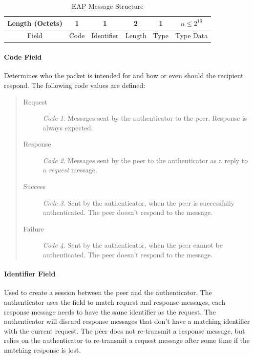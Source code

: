 \begin{table}
	\caption{EAP Message Structure}
	\vspace{0.1cm}
	\centering
	\begin{tabular}{|c|c|c|c|c|c|}
		\hline
		Length (Octets) & 1 & 1 & 2 & 1 & $n \le 2^{16}$\\
		\hline
		Field & Code & Identifier & Length & Type & Type Data\\
		\hline
	\end{tabular}
	\label{table:eap-message}
\end{table}

\paragraph{Code Field}
Determines who the packet is intended for and how or even should the recipient respond.
The following code values are defined:

\begin{quote}
\begin{description}
	\item[Request]\textit{Code 1}. Messages sent by the authenticator to the peer. Response is always expected.
	\item[Response]\textit{Code 2}. Messages sent by the peer to the authenticator as a reply to a \textit{request} message.
	\item[Success]\textit{Code 3}. Sent by the authenticator, when the peer is successfully authenticated. The peer doesn't respond to the message.
	\item[Failure]\textit{Code 4}. Sent by the authenticator, when the peer cannot be authenticated. The peer doesn't respond to the message.
\end{description}
\end{quote}

\paragraph{Identifier Field}
Used to create a session between the peer and the authenticator.
The authenticator uses the field to match request and response messages, each response message needs to have the same identifier as the request.
The authenticator will discard response messages that don't have a matching identifier with the current request.
The peer does not re-transmit a response message, but relies on the authenticator to re-transmit a request message after some time if the matching response is lost.

